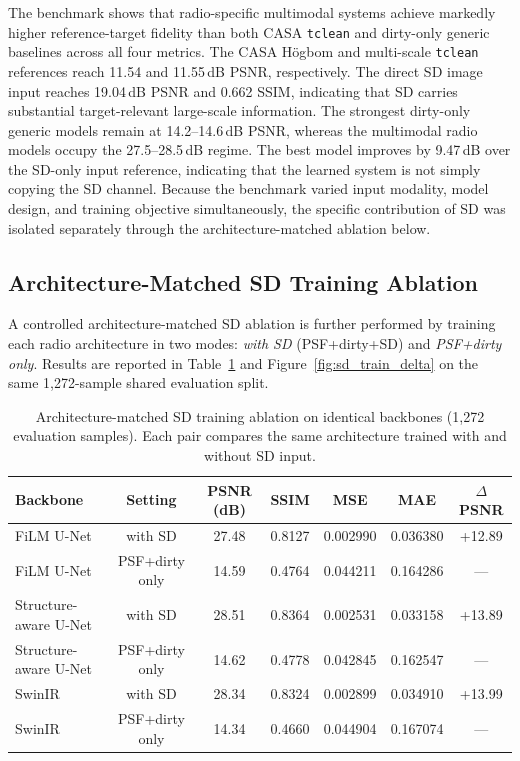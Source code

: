 \documentclass[twocolumn]{aastex631}
\begin{document}
The benchmark shows that radio-specific multimodal systems achieve markedly higher reference-target fidelity than both CASA \texttt{tclean} and dirty-only generic baselines across all four metrics.
The CASA H{\"o}gbom and multi-scale \texttt{tclean} references reach 11.54 and 11.55\,dB PSNR, respectively.
The direct SD image input reaches 19.04\,dB PSNR and 0.662 SSIM, indicating that SD carries substantial target-relevant large-scale information.
The strongest dirty-only generic models remain at 14.2--14.6\,dB PSNR, whereas the multimodal radio models occupy the 27.5--28.5\,dB regime.
The best model improves by 9.47\,dB over the SD-only input reference, indicating that the learned system is not simply copying the SD channel.
Because the benchmark varied input modality, model design, and training objective simultaneously, the specific contribution of SD was isolated separately through the architecture-matched ablation below.

\subsection{Architecture-Matched SD Training Ablation}

A controlled architecture-matched SD ablation is further performed by training each radio architecture in two modes: \textit{with SD} (PSF+dirty+SD) and \textit{PSF+dirty only}.
Results are reported in Table~\ref{tab:sd_train_ablation} and Figure~\ref{fig:sd_train_delta} on the same 1,272-sample shared evaluation split.

\begin{table}[htbp]
	\centering
	\caption{Architecture-matched SD training ablation on identical backbones (1,272 evaluation samples).
		Each pair compares the same architecture trained with and without SD input.
	}
	\label{tab:sd_train_ablation}
	\begin{tabular}{lcccccc}
		\toprule
		Backbone     & Setting            & PSNR (dB) & SSIM   & MSE      & MAE      & $\Delta$PSNR \\
		\midrule
		FiLM U-Net    & with SD            & 27.48     & 0.8127 & 0.002990 & 0.036380 & +12.89       \\
		FiLM U-Net    & PSF+dirty only & 14.59     & 0.4764 & 0.044211 & 0.164286 & ---          \\
		\midrule
		Structure-aware U-Net & with SD            & 28.51     & 0.8364 & 0.002531 & 0.033158 & +13.89       \\
		Structure-aware U-Net & PSF+dirty only & 14.62     & 0.4778 & 0.042845 & 0.162547 & ---          \\
		\midrule
		SwinIR       & with SD            & 28.34     & 0.8324 & 0.002899 & 0.034910 & +13.99       \\
		SwinIR       & PSF+dirty only & 14.34     & 0.4660 & 0.044904 & 0.167074 & ---          \\
		\bottomrule
	\end{tabular}
\end{table}
\end{document}
